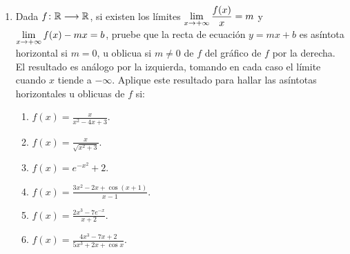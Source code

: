 \begin{multicols}{2}
\begin{enumerate}[leftmargin=*]
\item Dada $\funcjc{f}{\mathbb{R}}{\mathbb{R}}$, si existen los límites $\displaystyle \limjc{\frac{f(x)}{x}}{x}{+\infty} = m$ y $\displaystyle \limjc{f(x) - mx}{x}{+\infty} = b$, pruebe que la recta de ecuación $y = mx + b$ es asíntota horizontal si $m = 0$, u oblicua si $m \neq 0$ de $f$ del gráfico de $f$ por la derecha. El resultado es análogo por la izquierda, tomando en cada caso el límite cuando $x$ tiende a $-\infty$. Aplique este resultado para hallar las asíntotas horizontales u oblicuas de $f$ si:
    \begin{enumerate}[leftmargin=*]
    \item $\displaystyle f(x) = \frac{x}{x^2 - 4x + 3}$.
    \item $\displaystyle f(x) = \frac{x}{\sqrt{x^2 + 3}}$.
    \item $\displaystyle f(x) = e^{-x^2} + 2$.
    \item $\displaystyle f(x) = \frac{3x^2 - 2x + \cos(x + 1)}{x - 1}$.
    \item $\displaystyle f(x) = \frac{2x^3 - 7e^{-x}}{x + 2}$.
    \item $\displaystyle f(x) = \frac{4x^3 - 7x + 2}{5x^3 + 2x + \cos x}$.
    \end{enumerate}
\end{enumerate}
\end{multicols}
\endgroup
